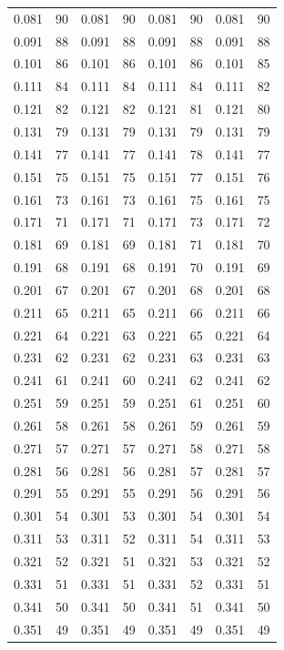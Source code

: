 \documentclass[12pt, a4paper]{article}
\begin{document}
\begin{center}
\begin{longtable}{| c | c | c | c | c | c | c | c |}
0.081 & 90 & 0.081 & 90 & 0.081 & 90 & 0.081 & 90 \\
0.091 & 88 & 0.091 & 88 & 0.091 & 88 & 0.091 & 88 \\
0.101 & 86 & 0.101 & 86 & 0.101 & 86 & 0.101 & 85 \\
0.111 & 84 & 0.111 & 84 & 0.111 & 84 & 0.111 & 82 \\
0.121 & 82 & 0.121 & 82 & 0.121 & 81 & 0.121 & 80 \\
0.131 & 79 & 0.131 & 79 & 0.131 & 79 & 0.131 & 79 \\
0.141 & 77 & 0.141 & 77 & 0.141 & 78 & 0.141 & 77 \\
0.151 & 75 & 0.151 & 75 & 0.151 & 77 & 0.151 & 76 \\
0.161 & 73 & 0.161 & 73 & 0.161 & 75 & 0.161 & 75 \\
0.171 & 71 & 0.171 & 71 & 0.171 & 73 & 0.171 & 72 \\
0.181 & 69 & 0.181 & 69 & 0.181 & 71 & 0.181 & 70 \\
0.191 & 68 & 0.191 & 68 & 0.191 & 70 & 0.191 & 69 \\
0.201 & 67 & 0.201 & 67 & 0.201 & 68 & 0.201 & 68 \\
0.211 & 65 & 0.211 & 65 & 0.211 & 66 & 0.211 & 66 \\
0.221 & 64 & 0.221 & 63 & 0.221 & 65 & 0.221 & 64 \\
0.231 & 62 & 0.231 & 62 & 0.231 & 63 & 0.231 & 63 \\
0.241 & 61 & 0.241 & 60 & 0.241 & 62 & 0.241 & 62 \\
0.251 & 59 & 0.251 & 59 & 0.251 & 61 & 0.251 & 60 \\
0.261 & 58 & 0.261 & 58 & 0.261 & 59 & 0.261 & 59 \\
0.271 & 57 & 0.271 & 57 & 0.271 & 58 & 0.271 & 58 \\
0.281 & 56 & 0.281 & 56 & 0.281 & 57 & 0.281 & 57 \\
0.291 & 55 & 0.291 & 55 & 0.291 & 56 & 0.291 & 56 \\
0.301 & 54 & 0.301 & 53 & 0.301 & 54 & 0.301 & 54 \\
0.311 & 53 & 0.311 & 52 & 0.311 & 54 & 0.311 & 53 \\
0.321 & 52 & 0.321 & 51 & 0.321 & 53 & 0.321 & 52 \\
0.331 & 51 & 0.331 & 51 & 0.331 & 52 & 0.331 & 51 \\
0.341 & 50 & 0.341 & 50 & 0.341 & 51 & 0.341 & 50 \\
0.351 & 49 & 0.351 & 49 & 0.351 & 49 & 0.351 & 49 \\

\end{longtable}
\end{center}
\end{document}
